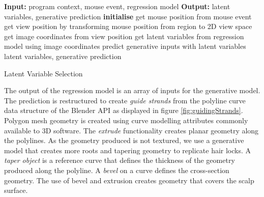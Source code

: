 \documentclass[ %
author={Dillon Keith Diep},
supervisor={Dr. Carl Henrik Ek},
degree={MEng},
title={ART-CG Hair:},
subtitle={Assisted Real-time Content Generation of Stylised Virtual Hair},
type={Research},
year={2017} ]{dissertation}
\begin{document}
	\begin{algorithm}[!h]
		\algrule
		\textbf{Input:} program context, mouse event, regression model\;
		\textbf{Output:} latent variables, generative prediction\;
		\algrule
		\textbf{initialise}\;
		{
			get mouse position from mouse event\;
			get view position by transforming mouse position from region to 2D view space\;
			get image coordinates from view position\;
			get latent variables from regression model using image coordinates\;
			predict generative inputs with latent variables\;
		}
		\Return latent variables, generative prediction
		\caption{Latent Variable Selection}
	\end{algorithm}
	
	The output of the regression model is an array of inputs for the generative model. The prediction is restructured to create \textit{guide strands} from the polyline curve data structure of the Blender API as displayed in figure \ref{fig:guidingStrands}. Polygon mesh geometry is created using curve modelling attributes commonly available to 3D software. The \textit{extrude} functionality creates planar geometry along the polylines. As the geometry produced is not textured, we use a generative model that creates more roots and tapering geometry to replicate hair locks.
	A \textit{taper object} is a reference curve that defines the thickness of the geometry produced along the polyline. A \textit{bevel} on a curve defines the cross-section geometry. The use of bevel and extrusion creates geometry that covers the scalp surface.
	
\end{document}
